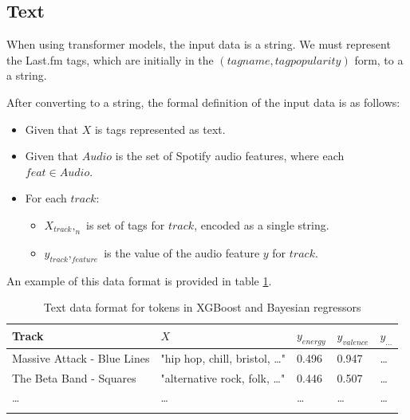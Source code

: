 \documentclass[sn-mathphys]{sn-jnl}%
\theoremstyle{thmstyleone}%
\theoremstyle{thmstyletwo}%
\theoremstyle{thmstylethree}%
\begin{document}
\subsection{Text}

When using transformer models, the input data is a string.
We must represent the Last.fm tags, which are initially in the $(tag name, tag popularity)$ form, to a a string.

After converting to a string, the formal definition of the input data is as follows:

\begin{itemize}
      \item Given that $X$ is tags represented as text.
      \item Given that $Audio$ is the set of Spotify audio features, where each $feat \in Audio$.
      \item For each $track$:
      \begin{itemize}
            \item $X_{track},_{n}$ is set of tags for $track$, encoded as a single string.
            \item $y_{track},_{feature}$ is the value of the audio feature $y$ for $track$.
      \end{itemize}
\end{itemize}

An example of this data format is provided in table \ref{text_format}.

\begin{table}[h]
      \begin{center}
      \begin{minipage}{\textwidth}
      \caption{Text data format for tokens in XGBoost and Bayesian regressors}\label{text_format}%
      \begin{tabular}{@{}lllll@{}}
      \toprule
      Track                         & $X$                                   & $y_{energy}$ & $y_{valence}$ & $y_{\dots}$ \\
      \midrule
      Massive Attack - Blue Lines   & "hip hop, chill, bristol, \dots"      & 0.496        & 0.947         & \dots  \\
      The Beta Band - Squares       & "alternative rock, folk, \dots"       & 0.446        & 0.507         & \dots \\
      \dots                         & \dots                                 & \dots        & \dots         & \dots  \\
      \botrule
      \end{tabular}
      \end{minipage}
      \end{center}
\end{table}
\end{document}
